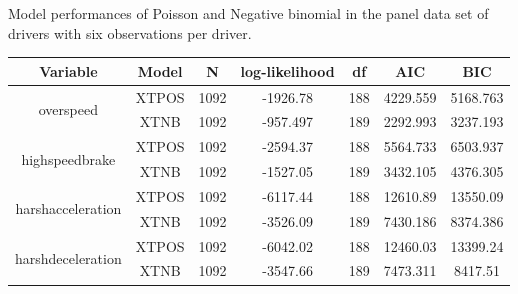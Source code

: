 \documentclass[entropy,article,submit,moreauthors,LaTeX and dvi2pdf]{Definitions/mdpi}
\begin{document}
\begin{specialtable}[htbp]
\widetable
\caption{Model performances of Poisson and Negative binomial in the panel data set of drivers with six observations per driver.}
\label{comparison_xt}
\begin{tabular}{ccccccc}
\toprule
Variable                           & Model & N    & log-likelihood & df  & AIC      & BIC      \\
\midrule
\multirow{2}{*}{overspeed}         & XTPOS & 1092 & -1926.78       & 188 & 4229.559 & 5168.763 \\
                                   & XTNB  & 1092 & -957.497       & 189 & 2292.993 & 3237.193 \\

\multirow{2}{*}{highspeedbrake}    & XTPOS & 1092 & -2594.37       & 188 & 5564.733 & 6503.937 \\
                                   & XTNB  & 1092 & -1527.05       & 189 & 3432.105 & 4376.305 \\

\multirow{2}{*}{harshacceleration} & XTPOS & 1092 & -6117.44       & 188 & 12610.89 & 13550.09 \\
                                   & XTNB  & 1092 & -3526.09       & 189 & 7430.186 & 8374.386 \\

\multirow{2}{*}{harshdeceleration} & XTPOS & 1092 & -6042.02       & 188 & 12460.03 & 13399.24 \\
                                   & XTNB  & 1092 & -3547.66       & 189 & 7473.311 & 8417.51\\
\bottomrule
\end{tabular}
\end{specialtable}
\end{document}
